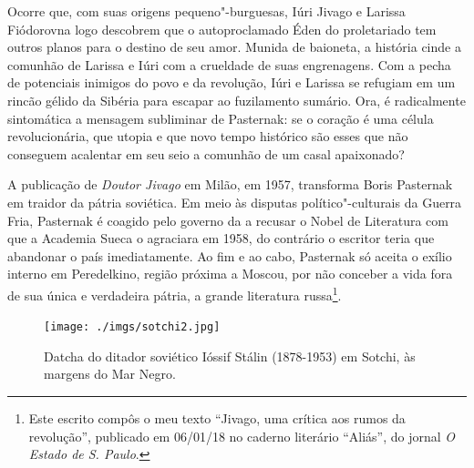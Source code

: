 Ocorre que, com suas origens pequeno"-burguesas, Iúri Jivago e Larissa
Fiódorovna logo descobrem que o autoproclamado Éden do proletariado tem
outros planos para o destino de seu amor. Munida de baioneta, a história
cinde a comunhão de Larissa e Iúri com a crueldade de suas engrenagens.
Com a pecha de potenciais inimigos do povo e da revolução, Iúri e
Larissa se refugiam em um rincão gélido da Sibéria para escapar ao
fuzilamento sumário. Ora, é radicalmente sintomática a mensagem
subliminar de Pasternak: se o coração é uma célula revolucionária, que
utopia e que novo tempo histórico são esses que não conseguem acalentar
em seu seio a comunhão de um casal apaixonado?

A publicação de \emph{Doutor Jivago} em Milão, em 1957, transforma Boris
Pasternak em traidor da pátria soviética. Em meio às disputas
político"-culturais da Guerra Fria, Pasternak é coagido pelo governo da
 a recusar o Nobel de Literatura com que a Academia Sueca o
agraciara em 1958, do contrário o escritor teria que abandonar o país
imediatamente. Ao fim e ao cabo, Pasternak só aceita o exílio interno em
Peredelkino, região próxima a Moscou, por não conceber a vida fora de
sua única e verdadeira pátria, a grande literatura russa\footnote{Este
  escrito compôs o meu texto ``Jivago, uma crítica aos rumos da
  revolução'', publicado em 06/01/18 no caderno literário ``Aliás'', do
  jornal \emph{O Estado de S. Paulo}.}.


\movetoevenpage
\begin{absolutelynopagebreak}
\begin{vplace}
\begin{figure}[H]
\begin{adjustwidth}{-1.8cm}{}
  \vspace{2.7cm}
  \texttt{[image: ./imgs/sotchi2.jpg]}  
\end{adjustwidth}
  \caption{Datcha do ditador soviético Ióssif Stálin (1878-1953) em Sotchi, às margens do Mar Negro.}%

\thispagestyle{empty}

\end{figure}
\end{vplace}

\end{absolutelynopagebreak}


